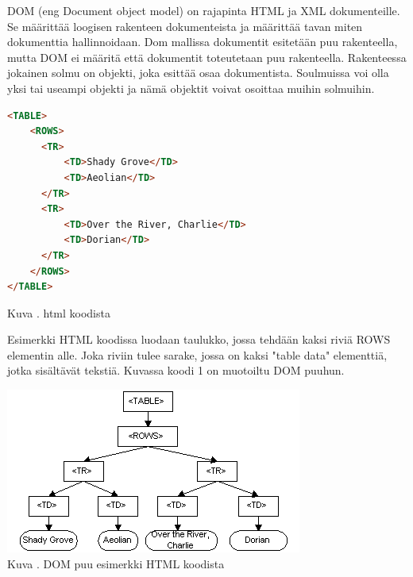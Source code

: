 

DOM (eng Document object model) on rajapinta HTML ja XML dokumenteille. 
Se määrittää loogisen rakenteen dokumenteista ja määrittää tavan miten dokumenttia hallinnoidaan.
Dom mallissa dokumentit esitetään puu rakenteella, mutta DOM ei määritä että dokumentit toteutetaan puu rakenteella.
Rakenteessa jokainen solmu on objekti, joka esittää osaa dokumentista. 
Soulmuissa voi olla yksi tai useampi objekti ja nämä objektit voivat osoittaa muihin solmuihin.
\bigskip



    
\begin{tcolorbox}
\begin{lstlisting}[language=html]
<TABLE>
    <ROWS> 
      <TR> 
          <TD>Shady Grove</TD>
          <TD>Aeolian</TD> 
      </TR> 
      <TR>
          <TD>Over the River, Charlie</TD>
          <TD>Dorian</TD> 
      </TR> 
    </ROWS>
</TABLE>
\end{lstlisting}
\end{tcolorbox}
Kuva \getImgCount. html koodista
\medskip


Esimerkki HTML koodissa luodaan taulukko, jossa tehdään kaksi riviä ROWS elementin alle. 
Joka riviin tulee sarake, jossa on kaksi "table data"{} elementtiä, jotka sisältävät tekstiä.
Kuvassa \nextImageCount {} koodi 1 on muotoiltu DOM puuhun.


\bigskip
\includegraphics{./src/public/oppar/dom.png}\\
Kuva \getImgCount {}. DOM puu esimerkki HTML koodista 
\medskip



